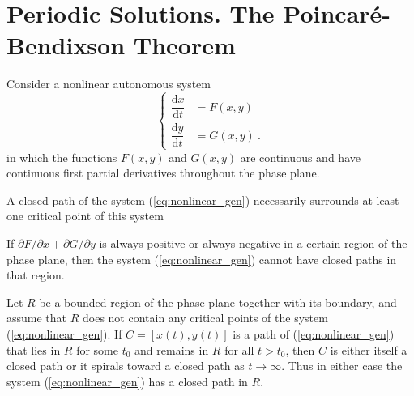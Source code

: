\documentclass[12pt,a4paper]{article}
\newcommand{\dif}{\mathrm{d}}
\begin{document}
\section{Periodic Solutions. The Poincar\'e-Bendixson Theorem}
\cite{george1991differential, simmons2016differential} Consider a nonlinear autonomous system
\begin{equation}
\left\{
\begin{aligned}
\dfrac{\dif x}{\dif t} & =  F(x,y) \\
\dfrac{\dif y}{\dif t} & =  G(x, y) ~.
\end{aligned}
\right.
\label{eq:nonlinear_gen}
\end{equation}
in which the functions $F(x,y)$ and $G(x,y)$ are continuous and have continuous first partial derivatives throughout the phase plane. 

\begin{tcolorbox}[colback=green!5,colframe=green!40!black,title= Theorem A]
A closed path of the system (\ref{eq:nonlinear_gen}) necessarily surrounds at least one critical point of this system
\end{tcolorbox}



\begin{tcolorbox}[colback=green!5,colframe=green!40!black,title= Theorem B]
If $\partial F/\partial x+\partial G/\partial y$ is always positive or always negative in a certain region of the phase plane, then the system (\ref{eq:nonlinear_gen}) cannot have closed paths in that region.
\end{tcolorbox}


\begin{tcolorbox}[colback=green!5,colframe=green!40!black,title= Theorem C]
Let $R$ be a bounded region of the phase plane together with its boundary, and assume that $R$ does not contain any critical points of the system (\ref{eq:nonlinear_gen}). If $C=[x(t),y(t)]$ is a path of (\ref{eq:nonlinear_gen}) that lies in $R$ for some $t_0$ and remains in $R$ for all $t > t_0$, then $C$ is either itself a closed path or it spirals toward a closed path as $t \rightarrow \infty$. Thus in either case the system (\ref{eq:nonlinear_gen}) has a closed path in $R$.
\end{tcolorbox}
\end{document}
